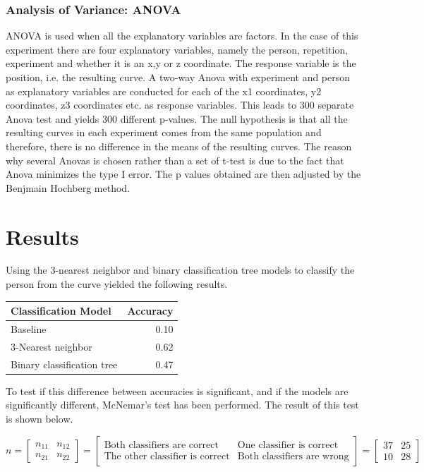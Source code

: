 \documentclass[11pt, fleqn, titlepage]{article}
\begin{document}
\subsubsection*{Analysis of Variance: ANOVA}
ANOVA is used when all the explanatory variables are factors. In the case of this experiment there are four explanatory variables, namely the person, repetition, experiment and whether it is an x,y or z coordinate. The response variable is the position, i.e. the resulting curve. A two-way Anova with experiment and person as explanatory variables are conducted for each of the x1 coordinates, y2 coordinates, z3 coordinates etc. as response variables. This leads to 300 separate Anova test and yields 300 different p-values. The null hypothesis is that all the resulting curves in each experiment comes from the same population and therefore, there is no difference in the means of the resulting curves. The reason why several Anovas is chosen rather than a set of t-test is due to the fact that Anova minimizes the type I error. The p values obtained are then adjusted by the Benjmain Hochberg method. \cite{statbog}


\section{Results}
Using the 3-nearest neighbor and binary classification tree models to classify the person from the curve yielded the following results.

\begin{table}[h]
	\centering
	\begin{tabular}{l r}
		\toprule
		Classification Model       & Accuracy  \\ \midrule
		Baseline                   & 0.10      \\
		3-Nearest neighbor         & 0.62      \\ 
		Binary classification tree & 0.47      \\ \bottomrule
	\end{tabular}
\end{table}

\noindent To test if this difference between accuracies is significant, and if the models are significantly different, McNemar's test has been performed. The result of this test is shown below.

\[n = \begin{bmatrix} n_{11} & n_{12} \\ n_{21} & n_{22} \end{bmatrix} = \begin{bmatrix} \text{Both classifiers are correct} & \text{One classifier is correct} \\ \text{The other classifier is correct} & \text{Both classifiers are wrong} \end{bmatrix} = \begin{bmatrix} 37 & 25 \\ 10 & 28 \end{bmatrix}\] 
\end{document}
